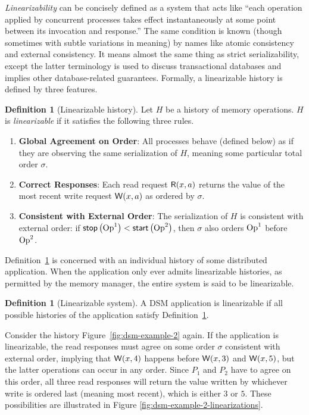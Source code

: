 \documentclass[]             %
{NASA}                       %
\theoremstyle{definition}
\newtheorem{definition}[theorem]{Definition}
\providecommand{\tightlist}{%
  \setlength{\itemsep}{0pt}\setlength{\parskip}{0pt}}
\begin{document}
\emph{Linearizability} can be concisely defined as a system that acts like
``each operation applied by concurrent processes takes effect
instantaneously at some point between its invocation and response.''
\cite{10.1145/78969.78972} The same condition is known (though
sometimes with subtle variations in meaning) by names like atomic
consistency and external consistency. It means almost the same thing
as strict serializability, except the latter terminology is used to
discuss transactional databases and implies other database-related
guarantees. Formally, a linearizable history is defined by three
features.
\begin{definition}[Linearizable history]
  \label{def:linearizable-history}
  Let $H$ be a history of memory operations. $H$ is
  \emph{linearizable} if it satisfies the following three rules.
\begin{enumerate}
  \tightlist
\item \textbf{Global Agreement on Order}: All processes behave
  (defined below) as if they are observing the same serialization of
  $H$, meaning some particular total order $\sigma$.
\item \textbf{Correct Responses}: Each read request
  \(\mathsf{R}\!\left(x, a\right)\) returns the value of the most recent write
  request \(\mathsf{W}\!\left(x, a\right)\) as ordered by $\sigma$.
\item \textbf{Consistent with External Order}: The serialization of
  $H$ is consistent with external order: if
  $\mathsf{stop}\left(\mathrm{Op}^1\right) < \mathsf{start}\left(\mathrm{Op}^2\right)$, then $\sigma$ also orders
  $\mathrm{Op}^1$ before $\mathrm{Op}^2$.
\end{enumerate}
\end{definition}

Definition~\ref{def:linearizable-history} is concerned with an
individual history of some distributed application. When the
application only ever admits linearizable histories, as permitted by
the memory manager, the entire system is said to be linearizable.

\begin{definition}[Linearizable system]
  \label{def:linearizable-system}
  A DSM application is linearizable if all possible histories of the
  application satisfy Definition~\ref{def:linearizable-history}.
\end{definition}

Consider the history Figure~\ref{fig:dsm-example-2} again. If the
application is linearizable, the read responses must agree on some
order $\sigma$ consistent with external order, implying that
$\mathsf{W}\!\left(x, 4\right)$ happens before $\mathsf{W}\!\left(x, 3\right)$ and
$\mathsf{W}\!\left(x, 5\right)$, but the latter operations can occur in any
order. Since $P_1$ and $P_2$ have to agree on this order, all three
read responses will return the value written by whichever write is
ordered last (meaning most recent), which is either $3$ or $5$. These
possibilities are illustrated in Figure
\ref{fig:dsm-example-2-linearizations}.
\end{document}
